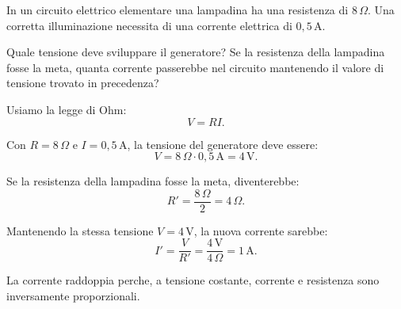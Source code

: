 
\begin{esercizio}
In un circuito elettrico elementare una lampadina ha una resistenza di
\(8\,\Omega\). Una corretta illuminazione necessita di una corrente elettrica
di \(0{,}5\,\mathrm{A}\).

Quale tensione deve sviluppare il generatore? Se la resistenza della lampadina
fosse la meta, quanta corrente passerebbe nel circuito mantenendo il valore di
tensione trovato in precedenza?
\end{esercizio}

\begin{soluzione}
Usiamo la legge di Ohm:
\[
V=RI.
\]

Con \(R=8\,\Omega\) e \(I=0{,}5\,\mathrm{A}\), la tensione del generatore deve
essere:
\[
V=8\,\Omega \cdot 0{,}5\,\mathrm{A}=4\,\mathrm{V}.
\]

Se la resistenza della lampadina fosse la meta, diventerebbe:
\[
R'=\frac{8\,\Omega}{2}=4\,\Omega.
\]

Mantenendo la stessa tensione \(V=4\,\mathrm{V}\), la nuova corrente sarebbe:
\[
I'=\frac{V}{R'}=\frac{4\,\mathrm{V}}{4\,\Omega}=1\,\mathrm{A}.
\]

La corrente raddoppia perche, a tensione costante, corrente e resistenza sono
inversamente proporzionali.
\end{soluzione}
